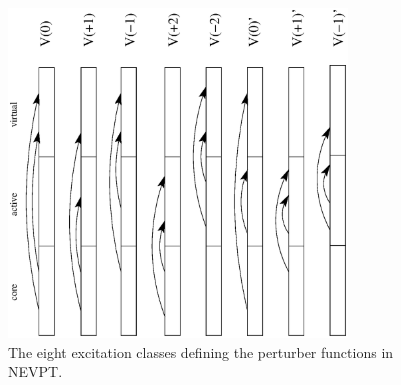 \begin{center}
\begin{figure}[ht]
\begin{center}
\includegraphics[width=9cm,angle=270]{03_nevpt/images/classes.ps}
\end{center}
\caption{\footnotesize The eight excitation classes defining the perturber
functions in NEVPT.}
\label{fig:classes}
\end{figure}
\end{center}
